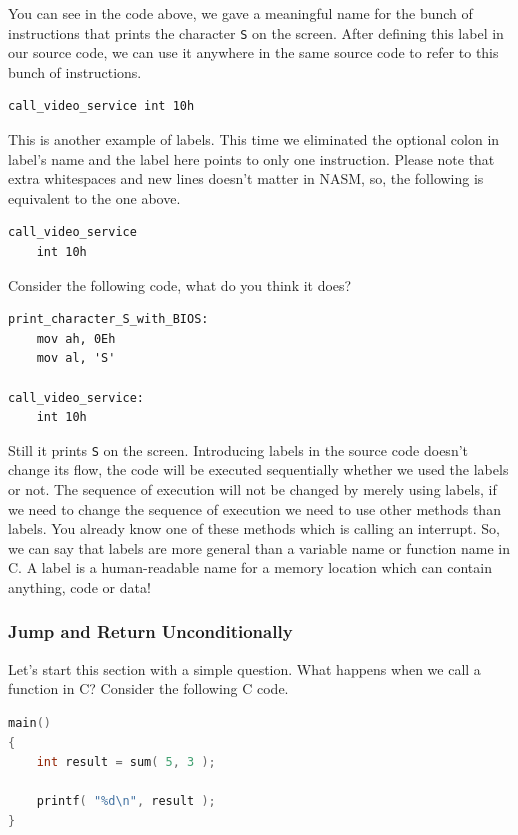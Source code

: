 You can see in the code above, we gave a meaningful name for the bunch
of instructions that prints the character \lstinline!S! on the screen.
After defining this label in our source code, we can use it anywhere in
the same source code to refer to this bunch of instructions.

\begin{lstlisting}
call_video_service int 10h
\end{lstlisting}

This is another example of labels. This time we eliminated the optional
colon in label's name and the label here points to only one instruction.
Please note that extra whitespaces and new lines doesn't matter in NASM,
so, the following is equivalent to the one above.

\begin{lstlisting}
call_video_service
    int 10h
\end{lstlisting}

Consider the following code, what do you think it does?

\begin{lstlisting}
print_character_S_with_BIOS:
    mov ah, 0Eh
    mov al, 'S'

call_video_service:
    int 10h
\end{lstlisting}

Still it prints \lstinline!S! on the screen. Introducing labels in the
source code doesn't change its flow, the code will be executed
sequentially whether we used the labels or not. The sequence of
execution will not be changed by merely using labels, if we need to
change the sequence of execution we need to use other methods than
labels. You already know one of these methods which is calling an
interrupt. So, we can say that labels are more general than a variable
name or function name in C. A label is a human-readable name for a
memory location which can contain anything, code or data!

\subsubsection{Jump and Return
Unconditionally}\label{jump-and-return-unconditionally}

Let's start this section with a simple question. What happens when we
call a function in C? Consider the following C code.

\begin{lstlisting}[language=C]
main()
{
    int result = sum( 5, 3 );

    printf( "%d\n", result );
}
\end{lstlisting}

